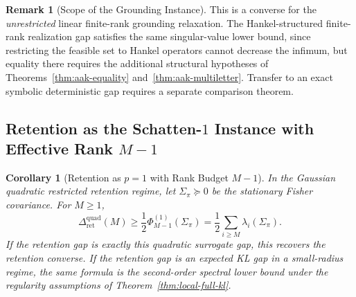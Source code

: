 \documentclass[12pt]{article}
\newtheorem{corollary}[theorem]{Corollary}
\theoremstyle{definition}
\newtheorem{remark}[theorem]{Remark}
\newcommand{\RetQuad}{\Delta_{\mathrm{ret}}^{\mathrm{quad}}}
\begin{document}
\begin{remark}[Scope of the Grounding Instance]
\label{rem:grd-schatten-scope}
This is a converse for the \emph{unrestricted} linear finite-rank grounding
relaxation.  The Hankel-structured finite-rank realization gap satisfies the
same singular-value lower bound, since restricting the feasible set to Hankel
operators cannot decrease the infimum, but equality there requires the
additional structural hypotheses of Theorems~\ref{thm:aak-equality}
and~\ref{thm:aak-multiletter}.  Transfer to an exact symbolic deterministic gap
requires a separate comparison theorem.
\end{remark}

\subsection{Retention as the Schatten-$1$ Instance with Effective Rank $M-1$}
\label{subsec:schatten-retention}

\begin{corollary}[Retention as $p=1$ with Rank Budget $M-1$]
\label{cor:ret-schatten}
In the Gaussian quadratic restricted retention regime, let
$\Sigma_\pi\succeq0$ be the stationary Fisher covariance.  For $M\ge1$,
\[
\RetQuad(M)
\ge
\frac12
\Phi^{(1)}_{M-1}(\Sigma_\pi)
=
\frac12
\sum_{i\ge M}
\lambda_i(\Sigma_\pi).
\]
If the retention gap is exactly this quadratic surrogate gap, this recovers
the retention converse.  If the retention gap is an expected KL gap in a
small-radius regime, the same formula is the second-order spectral lower bound
under the regularity assumptions of Theorem~\ref{thm:local-full-kl}.
\end{corollary}
\end{document}
